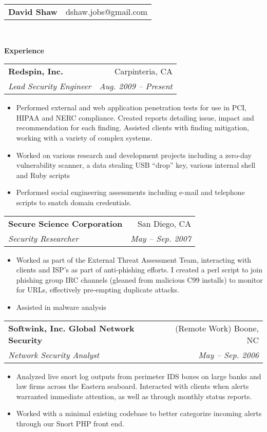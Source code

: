 \documentclass[letterpaper,11pt]{article}
\makeatletter
\newcommand{\resitem}[1]{\item #1 \vspace{-2pt}}
\newcommand{\resheading}[1]{{\large \colorbox{mygrey}{\begin{minipage}{\textwidth}{\textbf{#1 \vphantom{p\^{E}}}}\end{minipage}}}}
\newcommand{\ressubheading}[4]{
\begin{tabular*}{6.5in}{l@{\extracolsep{\fill}}r}
		\textbf{#1} & #2 \\
		\textit{#3} & \textit{#4} \\
\end{tabular*}\vspace{-6pt}}
\makeatother
\begin{document}
\thispagestyle{empty}
\newcommand{\mywebheader}{
\begin{tabular*}{7in}{l@{\extracolsep{\fill}}r}
	\textbf{{\LARGE David Shaw}} & {dshaw.jobs@gmail.com}
	\end{tabular*}
\\
\vspace{0.1in}}

\mywebheader

\resheading{Experience}
	\begin{description}
	\item\ressubheading{{Redspin, Inc.}}{Carpinteria, CA}{Lead Security Engineer}{Aug. 2009 -- Present}
				{ \footnotesize
				\begin{itemize}
					\resitem{Performed external and web application penetration tests for use in PCI, HIPAA and NERC compliance. Created reports detailing issue, impact and recommendation for each finding. Assisted clients with finding mitigation, working with a variety of complex systems.}
					\resitem{Worked on various research and development projects including a zero-day vulnerability scanner, a data stealing USB ``drop'' key, various internal shell and Ruby scripts}
					\resitem{Performed social engineering assessments including e-mail and telephone scripts to snatch domain credentials.}
				\end{itemize}
				}
	\item\ressubheading{{Secure Science Corporation}}{San Diego, CA}{Security Researcher}{May -- Sep. 2007}
				{ \footnotesize
				\begin{itemize}
					\resitem{Worked as part of the External Threat Assessment Team, interacting with clients and ISP's as part of anti-phishing efforts. I created a perl script to join phishing group IRC channels (gleaned from malicious C99 installs) to monitor for URLs, effectively pre-empting duplicate attacks.}
					\resitem{Assisted in malware analysis}
				\end{itemize}
          			}
	\item\ressubheading{{Softwink, Inc. Global Network Security}}{(Remote Work) Boone, NC}{Network Security Analyst}{May -- Sep. 2006}
				{ \footnotesize
				\begin{itemize}
					\resitem{Analyzed live snort log outputs from perimeter IDS boxes on large banks and law firms across the Eastern seaboard. Interacted with clients when alerts warranted immediate attention, as well as through monthly status reports.}
					\resitem{Worked with a minimal existing codebase to better categorize incoming alerts through our Snort PHP front end.}

\end{itemize}}
\end{description}
\end{document}
